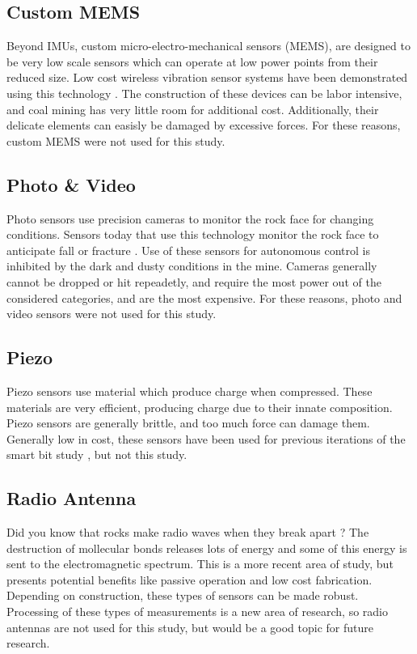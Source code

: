 \subsection{Custom MEMS}
Beyond IMUs, custom micro-electro-mechanical sensors (MEMS), are designed to be very low scale
sensors which can operate at low power points from their reduced size. 
Low cost wireless vibration sensor systems have been demonstrated using this technology \cite{9234762}.
The construction of these devices can be labor intensive, and coal mining has very little room for additional cost. 
Additionally, their delicate elements can easisly be damaged by excessive forces. 
For these reasons, custom MEMS were not used for this study.

\subsection{Photo \& Video}
Photo sensors use precision cameras to monitor the rock face for changing conditions.
Sensors today that use this technology monitor the rock face to anticipate fall or fracture \cite{duarte2022sensing}.
Use of these sensors for autonomous control is inhibited by the dark and dusty conditions in the mine.
Cameras generally cannot be dropped or hit repeadetly, and require the most power out of the considered categories,
and are the most expensive. For these reasons, photo and video sensors were not used for this study.

\subsection{Piezo}
Piezo sensors use material which produce charge when compressed. 
These materials are very efficient, producing charge due to their innate composition.
Piezo sensors are generally brittle, and too much force can damage them.
Generally low in cost, these sensors have been used for 
previous iterations of the smart bit study \cite{11124/170545}, but not this study.

\subsection{Radio Antenna}
Did you know that rocks make radio waves when they break apart \cite{qian1996experimental}? 
The destruction of mollecular bonds releases lots of energy
 and some of this energy is sent to the electromagnetic spectrum.
This is a more recent area of study, but presents potential benefits like
passive operation and low cost fabrication. 
Depending on construction, these types of sensors can be made robust.
Processing of these types of measurements is a new area of research,
so radio antennas are not used for this study, 
but would be a good topic for future research.


